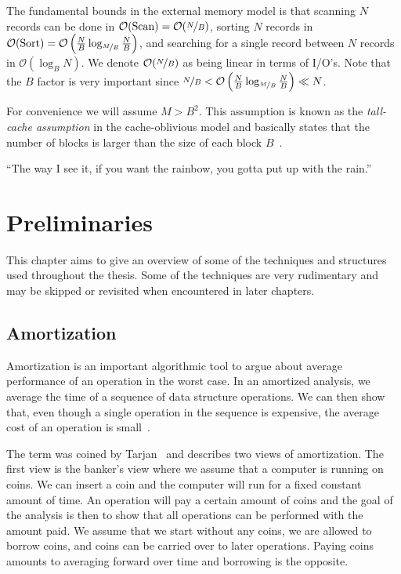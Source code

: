 \documentclass[twoside,11pt,openright]{report}
\begin{document}
The fundamental bounds in the external memory model is that scanning $N$ records can be done in $\mathcal{O}(\text{Scan}) = \mathcal{O}(\nicefrac{N}{B})$, sorting $N$ records in $\mathcal{O}(\text{Sort}) = \mathcal{O}\left(\frac{N}{B} \log_{\nicefrac{M}{B}}\frac{N}{B}\right)$, and searching for a single record between $N$ records in $\mathcal{O}(\log_B N)$. We denote $\mathcal{O}(\nicefrac{N}{B})$ as being linear in terms of I/O's. Note that the $B$ factor is very important since $\nicefrac{N}{B} < \mathcal{O}\left(\frac{N}{B} \log_{\nicefrac{M}{B}}\frac{N}{B}\right) \ll N$.

For convenience we will assume $M > B^2$. This assumption is known as the \textit{tall-cache assumption} in the cache-oblivious model and basically states that the number of blocks  is larger than the size of each block $B$~\cite{Prokop99cache-obliviousalgorithms}.

\begin{savequote}[0.42\textwidth]
``The way I see it, if you want the rainbow, you gotta put up with the rain.''
\end{savequote}
\chapter{Preliminaries}
\label{chp:prelims}
This chapter aims to give an overview of some of the techniques and structures used throughout the thesis. Some of the techniques are very rudimentary and may be skipped or revisited when encountered in later chapters.

\section{Amortization}
Amortization is an important algorithmic tool to argue about average performance of an operation in the worst case.
In an amortized analysis, we average the time of a sequence of data structure operations. We can then show that, even though a single operation in the sequence is expensive, the average cost of an operation is small~\cite[p.~451-452]{clrs}.

The term was coined by Tarjan~\cite{Tarjan85} and describes two views of amortization. The first view is the banker's view where we assume that a computer is running on coins. We can insert a coin and the computer will run for a fixed constant amount of time. An operation will pay a certain amount of coins and the goal of the analysis is then to show that all operations can be performed with the amount paid. We assume that we start without any coins, we are allowed to borrow coins, and coins can be carried over to later operations. Paying coins amounts to averaging forward over time and borrowing is the opposite.
\end{document}
